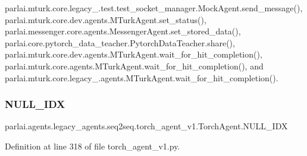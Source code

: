parlai.\+mturk.\+core.\+legacy\+\_.\+test.\+test\+\_\+socket\+\_\+manager.\+Mock\+Agent.\+send\+\_\+message(), parlai.\+mturk.\+core.\+dev.\+agents.\+M\+Turk\+Agent.\+set\+\_\+status(), parlai.\+messenger.\+core.\+agents.\+Messenger\+Agent.\+set\+\_\+stored\+\_\+data(), parlai.\+core.\+pytorch\+\_\+data\+\_\+teacher.\+Pytorch\+Data\+Teacher.\+share(), parlai.\+mturk.\+core.\+dev.\+agents.\+M\+Turk\+Agent.\+wait\+\_\+for\+\_\+hit\+\_\+completion(), parlai.\+mturk.\+core.\+agents.\+M\+Turk\+Agent.\+wait\+\_\+for\+\_\+hit\+\_\+completion(), and parlai.\+mturk.\+core.\+legacy\+\_.\+agents.\+M\+Turk\+Agent.\+wait\+\_\+for\+\_\+hit\+\_\+completion().

\mbox{\label{classparlai_1_1agents_1_1legacy__agents_1_1seq2seq_1_1torch__agent__v1_1_1TorchAgent_a6e6a5f2f7644a6cc273bfa25eca17df6}} 
\subsubsection{\texorpdfstring{N\+U\+L\+L\+\_\+\+I\+DX}{NULL\_IDX}}
{\footnotesize\ttfamily parlai.\+agents.\+legacy\+\_\+agents.\+seq2seq.\+torch\+\_\+agent\+\_\+v1.\+Torch\+Agent.\+N\+U\+L\+L\+\_\+\+I\+DX}



Definition at line 318 of file torch\+\_\+agent\+\_\+v1.\+py.



